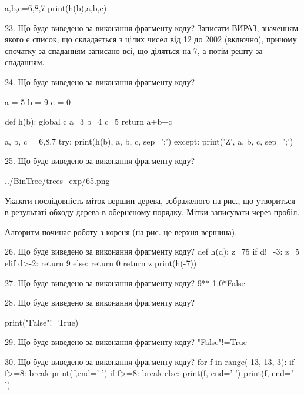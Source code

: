 \documentclass[11pt]{article}
\begin{document}
a,b,c=6,8,7
print(h(b),a,b,c)


23. Що буде виведено за виконання фрагменту коду?
Записати ВИРАЗ, значенням якого є список, що складається з цілих чисел від 12 до 2002 (включно), причому спочатку за спаданням записано всі, що діляться на 7, а потім решту за спаданням.


24. Що буде виведено за виконання фрагменту коду?

a = 5
b = 9
c = 0

def h(b):
global c    a=3
    b=4
    c=5
    return a+b+c

a, b, c = 6,8,7
try:
    print(h(b), a, b, c, sep=';')
except:
    print('Z', a, b, c, sep=';')


25. Що буде виведено за виконання фрагменту коду?

\begin{center}
	{../BinTree/trees_exp/65.png}
\end{center}
Указати послідовність міток вершин дерева, зображеного на рис., що утвориться в результаті обходу дерева в оберненому порядку. Мітки записувати через пробіл.\par Алгоритм починає роботу з кореня (на рис. це верхня вершина).


26. Що буде виведено за виконання фрагменту коду?
def h(d):
      z=75
      if d!=-3: z=5
      elif d>-2: return 9
      else: return 0
      return z
   print(h(-7))

27. Що буде виведено за виконання фрагменту коду?
9**-1.0*False

28. Що буде виведено за виконання фрагменту коду?

print("False"!=True)


29. Що буде виведено за виконання фрагменту коду?
"False"!=True

30. Що буде виведено за виконання фрагменту коду?
for f in range(-13,-13,-3):
    if f>=8:
        break
        print(f,end=' ')
    if f>=8:
        break
else:
    print(f, end=' ')
print(f, end=' ')

\end{document}
